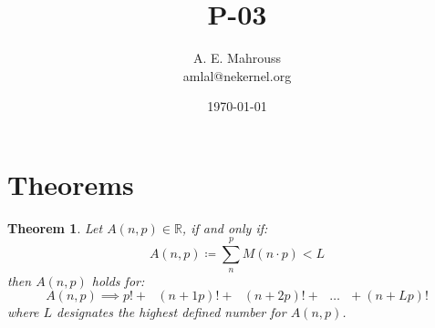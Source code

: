\documentclass{article}
\title{P-03}
\author{A. E. Mahrouss\\amlal@nekernel.org}
\date{\today}
\theoremstyle{plain}
\newtheorem{theorem}{Theorem}[section]
\theoremstyle{definition}
\theoremstyle{remark}
\begin{document}
\maketitle

\section{Theorems}

\begin{theorem}
Let $A(n, p) \in \mathbb{R}$, if and only if:
\begin{equation}
    A(n, p) \coloneq \sum_{n}^{p} M(n \cdot p) < L
\end{equation}
then $A(n, p)$ holds for:
\begin{equation}
    A(n, p) \implies p! + \text{ } (n+1p)! + \text{ } (n+2p)! + \text{ } \dots \text{ } + (n+Lp)! 
\end{equation}
where $L$ designates the highest defined number for $A(n, p)$.
\end{theorem}
\end{document}
